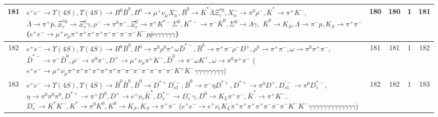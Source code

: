 \documentclass[landscape]{article}
\begin{document}
\begin{table}[htbp!]
\begin{tabular}{|c|>{\centering}p{18cm}|c|c|c|c|}
\hline
181 & \makecell{ $ 
e^{+} e^{-} \rightarrow \Upsilon(4S) ,
\Upsilon(4S) \rightarrow B^{0} \bar{B}^{0} ,
B^{0} \rightarrow \mu^{+} \nu_{\mu} X_{u}^{-} ,
\bar{B}^{0} \rightarrow \bar{K}^{*} \bar{\Lambda} \Xi_{c}^{*0} ,
X_{u}^{-} \rightarrow \pi^{0} \rho^{-} ,
\bar{K}^{*} \rightarrow \pi^{+} K^{-} ,
$ \\ $
\bar{\Lambda} \rightarrow \pi^{+} \bar{p} ,
\Xi_{c}^{*0} \rightarrow \Xi_{c}^{0} \gamma ,
\rho^{-} \rightarrow \pi^{0} \pi^{-} ,
\Xi_{c}^{0} \rightarrow \pi^{+} K^{*-} \Sigma^{0} ,
K^{*-} \rightarrow \pi^{-} \bar{K}^{0} ,
\Sigma^{0} \rightarrow \Lambda \gamma ,
$ \\ $
\bar{K}^{0} \rightarrow K_{S} ,
\Lambda \rightarrow \pi^{-} p ,
K_{S} \rightarrow \pi^{+} \pi^{-} 
$ \\ ($
e^{+} e^{-} \rightarrow \mu^{+} \nu_{\mu} \pi^{+} \pi^{+} \pi^{+} \pi^{+} \pi^{-} \pi^{-} \pi^{-} \pi^{-} K^{-} p \bar{p} \gamma \gamma \gamma \gamma \gamma \gamma 
$) } & 180 & 180 & 1 & 181 \\
\hline
182 & \makecell{ $ 
e^{+} e^{-} \rightarrow \Upsilon(4S) ,
\Upsilon(4S) \rightarrow B^{0} \bar{B}^{0} ,
B^{0} \rightarrow \pi^{0} \rho^{0} \pi^{+} \omega \bar{D}^{*-} ,
\bar{B}^{0} \rightarrow \pi^{+} \pi^{-} \rho^{-} D^{+} ,
\rho^{0} \rightarrow \pi^{+} \pi^{-} ,
\omega \rightarrow \pi^{0} \pi^{+} \pi^{-} ,
$ \\ $
\bar{D}^{*-} \rightarrow \pi^{-} \bar{D}^{0} ,
\rho^{-} \rightarrow \pi^{0} \pi^{-} ,
D^{+} \rightarrow \mu^{+} \nu_{\mu} \pi^{+} K^{-} ,
\bar{D}^{0} \rightarrow \pi^{-} \omega K^{+} ,
\omega \rightarrow \pi^{0} \pi^{+} \pi^{-} 
$ \\ ($
e^{+} e^{-} \rightarrow \mu^{+} \nu_{\mu} \pi^{+} \pi^{+} \pi^{+} \pi^{+} \pi^{+} \pi^{+} \pi^{-} \pi^{-} \pi^{-} \pi^{-} \pi^{-} \pi^{-} \pi^{-} K^{+} K^{-} \gamma \gamma \gamma \gamma \gamma \gamma \gamma \gamma 
$) } & 181 & 181 & 1 & 182 \\
\hline
183 & \makecell{ $ 
e^{+} e^{-} \rightarrow \Upsilon(4S) ,
\Upsilon(4S) \rightarrow \bar{B}^{0} \bar{B}^{0} ,
\bar{B}^{0} \rightarrow D^{*+} D_{s1}^{\prime-} ,
\bar{B}^{0} \rightarrow \pi^{-} \eta D^{*+} ,
D^{*+} \rightarrow \pi^{0} D^{+} ,
D_{s1}^{\prime-} \rightarrow \pi^{0} D_{s}^{*-} ,
$ \\ $
\eta \rightarrow \pi^{0} \pi^{0} \pi^{0} ,
D^{*+} \rightarrow \pi^{+} D^{0} ,
D^{+} \rightarrow e^{+} \nu_{e} \bar{K}^{*} ,
D_{s}^{*-} \rightarrow D_{s}^{-} \gamma ,
D^{0} \rightarrow K_{L} \pi^{+} \pi^{-} ,
\bar{K}^{*} \rightarrow \pi^{+} K^{-} ,
$ \\ $
D_{s}^{-} \rightarrow K^{*} K^{-} ,
K^{*} \rightarrow \pi^{0} K^{0} ,
K^{0} \rightarrow K_{S} ,
K_{S} \rightarrow \pi^{+} \pi^{-} 
$ \\ ($
e^{+} e^{-} \rightarrow e^{+} \nu_{e} K_{L} \pi^{+} \pi^{+} \pi^{+} \pi^{+} \pi^{-} \pi^{-} \pi^{-} K^{-} K^{-} \gamma \gamma \gamma \gamma \gamma \gamma \gamma \gamma \gamma \gamma \gamma \gamma \gamma 
$) } & 182 & 182 & 1 & 183 \\
\hline
\end{tabular}
\end{table}
\end{document}
